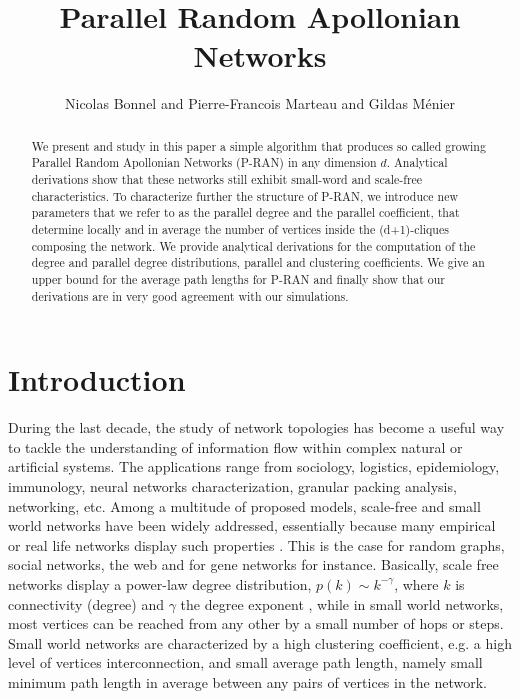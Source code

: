\documentclass[11pt]{iopart}
\begin{document}
\title{Parallel Random Apollonian Networks}

\author{Nicolas Bonnel and Pierre-Francois Marteau and Gildas M\'enier}

\address{VALORIA, Universit\'e de Bretagne Sud, Universit\'e Europ\'eenne de Bretagne, Campus de Tohannic, 56 000 Vannes, France}
\begin{abstract}
We present and study in this paper a simple algorithm that produces  so called growing Parallel Random Apollonian Networks (P-RAN) in any dimension $d$. Analytical derivations show that these networks still exhibit small-word and scale-free characteristics. To characterize further the structure of P-RAN, we introduce new parameters that we refer to as the parallel degree and the parallel coefficient, that determine locally and in average the number of vertices inside the (d+1)-cliques composing the network. We provide analytical derivations for the computation of the degree and parallel degree distributions, parallel and clustering coefficients. We give an upper bound for the average path lengths for P-RAN and finally show that our derivations are in very good agreement with our simulations.
\end{abstract}

\maketitle

\section{Introduction}

During the last decade, the study of network topologies has become a useful way to tackle the understanding of information flow within complex natural or artificial systems. The applications range from sociology, logistics, epidemiology, immunology, neural networks characterization, granular packing analysis, networking, etc.  Among a multitude of proposed models, scale-free and small world networks have been widely addressed, essentially because many empirical or real life networks display such properties \cite{citeulike:298144,citeulike:696940}. This is the case for random graphs, social networks, the web and for gene networks for instance. Basically, scale free networks display a power-law degree distribution, $p(k) \sim k^{-\gamma}$, where $k$ is connectivity (degree) and $\gamma$ the degree exponent \cite{barabasi-1999}, while in small world networks, most vertices can be reached from any other by a small number of hops or steps.  Small world networks are characterized by a high clustering coefficient, e.g. a high level of vertices interconnection, and small average path length, namely small minimum path length in average between any pairs of vertices in the network.
\end{document}
